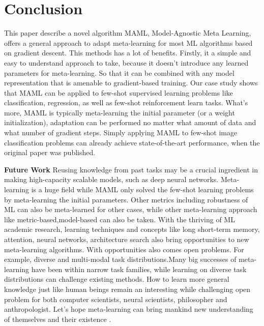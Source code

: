 \section{Conclusion}

This paper describe a novel algorithm MAML, Model-Agnostic Meta Learning, offers a general approach to adapt meta-learning for most ML algorithms based on gradient descent. 
This methods has a lot of benefits. Firstly, it a simple and easy to understand approach to take, because it doesn't introduce any learned parameters for meta-learning. So that it can be combined with any model representation that is amenable to gradient-based training. Our case study shows that MAML can be applied to few-shot supervised learning problems like classification, regression, as well as few-shot reinforcement learn tasks. What's more, MAML is typically meta-learning the initial parameter (or a weight initialization), adaptation can be performed no matter what amount of data and what number of gradient steps. Simply applying MAML to few-shot image classification problems can already achieve state-of-the-art performance, when the original paper was published. 

\textbf{Future Work} 
Reusing knowledge from past tasks may be a crucial ingredient in making high-capacity scalable models, such as deep neural networks. 
Meta-learning is a huge field while MAML only solved the few-shot learning problems by meta-learning the initial parameters. Other metrics including robustness of ML can also be meta-learned for other cases, while other meta-learning approach like  metric-based,model-based can also be taken. With the thriving of ML academic research, learning techniques and concepts like long short-term memory, attention, neural networks, architecture search also bring opportunities to new meta-learning algorithms.
With opportunities also comes open problems. For example, diverse and multi-modal task distributions.Many big successes of meta-learning have been within narrow task families, while learning on diverse task distributions can challenge existing methods. How to learn more general knowledge just like human beings remain an interesting while challenging open problem for both computer scientists, neural scientists, philosopher and anthropologist. Let's hope meta-learning can bring mankind new understanding of themselves and their existence .


